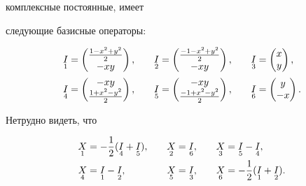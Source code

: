 комплексные постоянные, имеет 


следующие базисные операторы: 


\begin{alignat*}{3} 


\down{1}{I}&=\begin{pmatrix} 


\frac{1-x^2+y^2}{2} \\ -x y 


\end{pmatrix} 


, &\quad \down{2}{I}&=\begin{pmatrix} 


\frac{-1-x^2+y^2}{2} \\ -x y 


\end{pmatrix} 


, &\quad \down{3}{I}&=\begin{pmatrix} 


x \\y 


\end{pmatrix} 


, \\ 


\down{4}{I}&=\begin{pmatrix} 


-x y \\\frac{1+x^2-y^2}{2} 


\end{pmatrix} 


, &\quad \down{5}{I}&=\begin{pmatrix} 


-x y \\ \frac{-1+x^2-y^2}{2} 


\end{pmatrix} 


, &\quad \down{6}{I}&=\begin{pmatrix} 


y \\ -x 


\end{pmatrix} 


. 


\end{alignat*} 


Нетрудно видеть, что 


\begin{alignat*}{3} 


\down{1}{X}&=-\frac{1}{2}(\down{4}{I}+\down{5}{I}), &\quad 


\down{2}{X}&=\down{6}{I}, &\quad \down{3}{X}&= 


\down{5}{I}-\down{4}{I}, \\ 


% 


\down{4}{X}&=\down{1}{I}-\down{2}{I}, &\quad 


\down{5}{X}&=\down{3}{I}, &\quad \down{6}{X}&= 


-\frac{1}{2}(\down{1}{I}+\down{2}{I}). 


\end{alignat*} 


